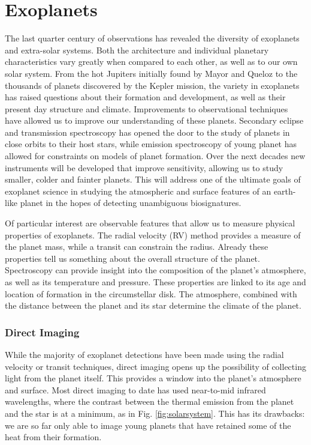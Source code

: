 \section{Exoplanets}
The last quarter century of observations has revealed the diversity of exoplanets and extra-solar systems.
Both the architecture and individual planetary characteristics vary greatly when compared to each other, as well as to our own solar system.
From the hot Jupiters initially found by Mayor and Queloz \parencite{Mayor1995} to the thousands of planets discovered by the Kepler mission, the variety in exoplanets has raised questions about their formation and development, as well as their present day structure and climate.
Improvements to observational techniques have allowed us to improve our understanding of these planets.
Secondary eclipse and transmission spectroscopy has opened the door to the study of planets in close orbits to their host stars, while emission spectroscopy of young planet has allowed for constraints on models of planet formation.
Over the next decades new instruments will be developed that improve sensitivity, allowing us to study smaller, colder and fainter planets.
This will address one of the ultimate goals of exoplanet science in studying the atmospheric and surface features of an earth-like planet in the hopes of detecting unambiguous biosignatures.

Of particular interest are observable features that allow us to measure physical properties of exoplanets.
The radial velocity (RV) method provides a measure of the planet mass, while a transit can constrain the radius.
Already these properties tell us something about the overall structure of the planet.
Spectroscopy can provide insight into the composition of the planet's atmosphere, as well as its temperature and pressure.
These properties are linked to its age and location of formation in the circumstellar disk.
The atmosphere, combined with the distance between the planet and its star determine the climate of the planet.

\subsubsection{Direct Imaging}
While the majority of exoplanet detections have been made using the radial velocity or transit techniques, direct imaging opens up the possibility of collecting light from the planet itself.
This provides a window into the planet's atmosphere and surface.
Most direct imaging to date has used near-to-mid infrared wavelengths, where the contrast between the thermal emission from the planet and the star is at a minimum, as in Fig. \ref{fig:solarsystem}.
This has its drawbacks: we are so far only able to image young planets that have retained some of the heat from their formation.
 
